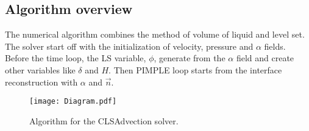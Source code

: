 \subsection{Algorithm overview}
The numerical algorithm combines the method of volume of liquid  and level set. The solver start off with the initialization of velocity, pressure and $\alpha$ fields. Before the time loop, the LS variable, $\phi$, generate from the $\alpha$ field and create other variables like $\delta$ and $H$. Then PIMPLE loop starts from the interface reconstruction with $\alpha$ and $\vec{n}$. 
\begin{figure}[htbp]
\centering
\texttt{[image: Diagram.pdf]}
\caption{Algorithm for the CLSAdvection solver.}
\label{fig:AlgorithmProcess}
\end{figure}